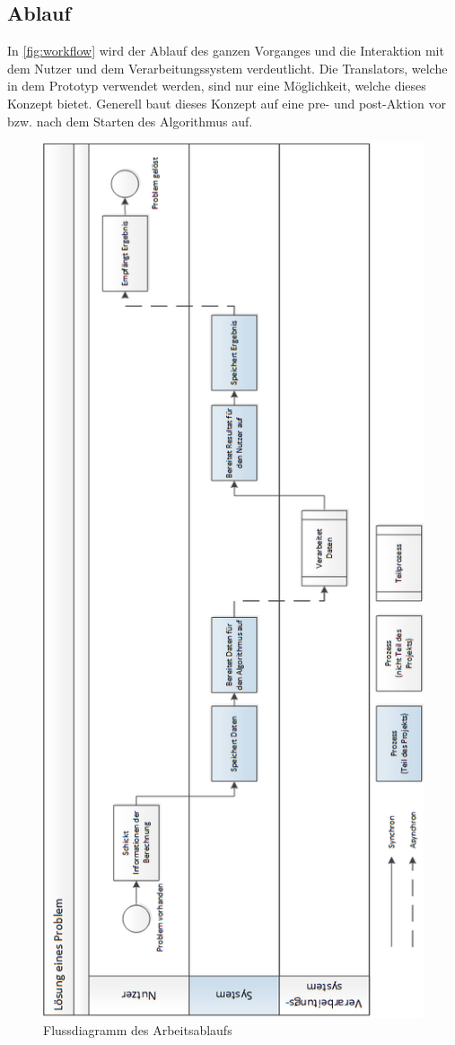 \newpage
\subsection{Ablauf}
In \autoref{fig:workflow} wird der Ablauf des ganzen Vorganges und die Interaktion mit dem Nutzer und dem Verarbeitungssystem verdeutlicht. Die Translators, welche in dem 
Prototyp verwendet werden, sind nur eine Möglichkeit, welche dieses Konzept bietet. Generell baut dieses Konzept auf eine pre- und post-Aktion vor bzw. nach dem Starten des Algorithmus 
auf.

\begin{figure}[h]
\centering
\includegraphics[scale=0.605]{images/visio/workflow.png}
\caption[Flussdiagramm des Arbeitsablaufs]{Flussdiagramm des Arbeitsablaufs \selfmade{}}
\label{fig:workflow}
\end{figure}

